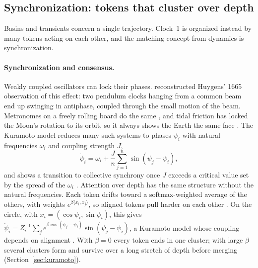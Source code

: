 \subsection{Synchronization: tokens that cluster over depth}
\label{sec:particles}

Basins and transients concern a single trajectory. Clock~1 is organized instead by many tokens acting on each other, and the matching concept from dynamics is synchronization.

\paragraph{Synchronization and consensus.} Weakly coupled oscillators can lock their phases. \citet{bennett2002huygens} reconstructed Huygens' 1665 observation of this effect: two pendulum clocks hanging from a common beam end up swinging in antiphase, coupled through the small motion of the beam. Metronomes on a freely rolling board do the same \citep{pantaleone2002synchronization}, and tidal friction has locked the Moon's rotation to its orbit, so it always shows the Earth the same face \citep{goldreich1966spin}. The Kuramoto model reduces many such systems to phases $\psi_i$ with natural frequencies $\omega_i$ and coupling strength $J$,
\begin{equation}
\dot\psi_i=\omega_i+\frac{J}{n}\sum_{j=1}^{n}\sin(\psi_j-\psi_i),
\label{eq:kuramoto}
\end{equation}
and shows a transition to collective synchrony once $J$ exceeds a critical value set by the spread of the $\omega_i$ \citep{kuramoto1975self,acebron2005kuramoto}. Attention over depth has the same structure without the natural frequencies. Each token drifts toward a softmax-weighted average of the others, with weights $e^{\beta\langle x_i,x_j\rangle}$, so aligned tokens pull harder on each other \citep{geshkovski2023mathematical}. On the circle, with $x_i=(\cos\psi_i,\sin\psi_i)$, this gives $\dot\psi_i=Z_i^{-1}\sum_j e^{\beta\cos(\psi_j-\psi_i)}\sin(\psi_j-\psi_i)$, a Kuramoto model whose coupling depends on alignment \citep{li2026diverse}. With $\beta=0$ every token ends in one cluster; with large $\beta$ several clusters form and survive over a long stretch of depth before merging (Section~\ref{sec:kuramoto}).

